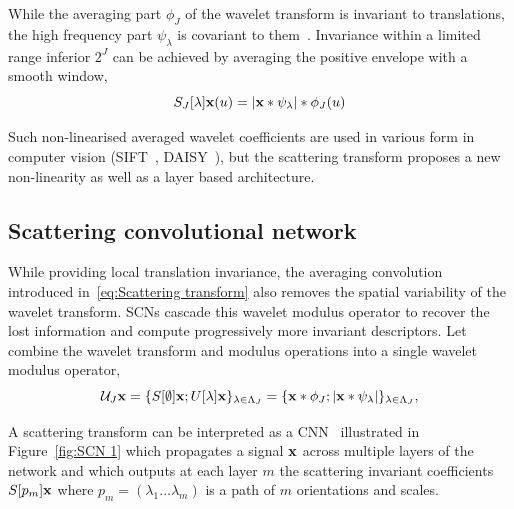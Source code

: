 \documentclass{article}
\begin{document}
    While the averaging part $\phi_{J}$ of the wavelet transform is invariant to translations, the high frequency part $\psi_{\lambda}$ is covariant to them~\cite{mallat2012gis}. Invariance within a limited range inferior $2^{J}$ can be achieved by averaging the positive envelope with a smooth window,
    \vspace{-5pt}
    \begin{equation}
      \label{eq:Scattering transform}
      S_{J}[\lambda]{\bf x}(u) = \left| {\bf x} \ast \psi_{\lambda} \right| \ast \phi_{J}(u)
    \end{equation}
    \vspace{-10pt}
    
    Such non-linearised averaged wavelet coefficients are used in various form in computer vision (SIFT~\cite{grabner2006fast}, DAISY~\cite{winder2009picking}), but the scattering transform proposes a new non-linearity as well as a layer based architecture.
  
  \subsection{Scattering convolutional network}
    \label{subsec:SCN/SCN}
    While providing local translation invariance, the averaging convolution introduced in~\ref{eq:Scattering transform} also removes the spatial variability of the wavelet transform. SCNs cascade this wavelet modulus operator to recover the lost information and compute progressively more invariant descriptors. Let combine the wavelet transform and modulus operations into a single wavelet modulus operator,
    \vspace{-5pt}
    \begin{equation}
      \mathcal{U}_{J} {\bf x} = \{ S[\emptyset] {\bf x} ; U[\lambda]{\bf x} \}_{\lambda \in \Lambda_{J}} 
          = \{ {\bf x} \ast \phi_{J}; \left| {\bf x} \ast \psi_{\lambda} \right| \}_{\lambda \in \Lambda_{J}},
      \label{eq:One step propagator}
    \end{equation}
    
    A scattering transform can be interpreted as a CNN~\cite{oyallon2014deep} illustrated in Figure~\ref{fig:SCN 1} which propagates a signal ${\bf x}$ across multiple layers of the network and which outputs at each layer $m$ the scattering invariant coefficients $S[p_{m}]{\bf x}$ where $p_{m}=(\lambda_{1} \dots \lambda_{m})$ is a path of $m$ orientations and scales.
    
\end{document}
